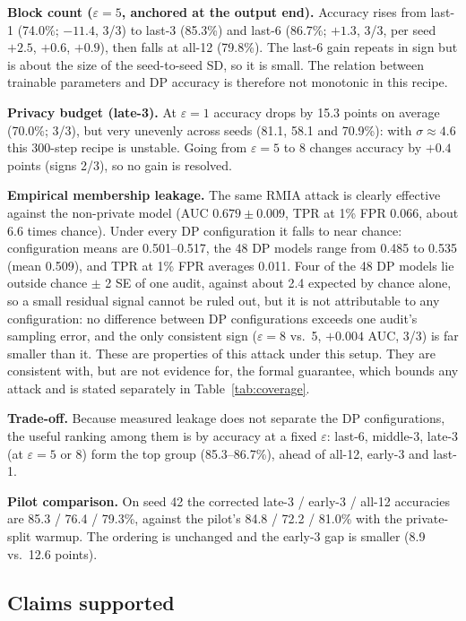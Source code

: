 \documentclass[11pt,a4paper]{article}
\begin{document}
\textbf{Block count ($\varepsilon = 5$, anchored at the output end).} Accuracy rises from last-1 (74.0\%; $-11.4$,
3/3) to last-3 (85.3\%) and last-6 (86.7\%; $+1.3$, 3/3, per seed $+2.5$, $+0.6$, $+0.9$), then falls at all-12
(79.8\%). The last-6 gain repeats in sign but is about the size of the seed-to-seed SD, so it is small. The
relation between trainable parameters and DP accuracy is therefore not monotonic in this recipe.

\textbf{Privacy budget (late-3).} At $\varepsilon = 1$ accuracy drops by 15.3 points on average (70.0\%; 3/3), but
very unevenly across seeds (81.1, 58.1 and 70.9\%): with $\sigma \approx 4.6$ this 300-step recipe is unstable.
Going from $\varepsilon = 5$ to 8 changes accuracy by $+0.4$ points (signs 2/3), so no gain is resolved.

\textbf{Empirical membership leakage.} The same RMIA attack is clearly effective against the non-private model
(AUC $0.679 \pm 0.009$, TPR at 1\% FPR $0.066$, about 6.6 times chance). Under every DP configuration it falls to
near chance: configuration means are 0.501--0.517, the 48 DP models range from 0.485 to 0.535 (mean 0.509), and
TPR at 1\% FPR averages 0.011. Four of the 48 DP models lie outside chance $\pm$ 2 SE of one audit, against about
2.4 expected by chance alone, so a small residual signal cannot be ruled out, but it is not attributable to any
configuration: no difference between DP configurations exceeds one audit's sampling error, and the only
consistent sign ($\varepsilon = 8$ vs.\ 5, $+0.004$ AUC, 3/3) is far smaller than it. These are properties of
this attack under this setup. They are consistent with, but are not evidence for, the formal guarantee, which
bounds any attack and is stated separately in Table~\ref{tab:coverage}.

\textbf{Trade-off.} Because measured leakage does not separate the DP configurations, the useful ranking among
them is by accuracy at a fixed $\varepsilon$: last-6, middle-3, late-3 (at $\varepsilon = 5$ or 8) form the top
group (85.3--86.7\%), ahead of all-12, early-3 and last-1.

\textbf{Pilot comparison.} On seed 42 the corrected late-3 / early-3 / all-12 accuracies are 85.3 / 76.4 /
79.3\%, against the pilot's 84.8 / 72.2 / 81.0\% with the private-split warmup. The ordering is unchanged and
the early-3 gap is smaller (8.9 vs.\ 12.6 points).

\subsection{Claims supported}
\end{document}
